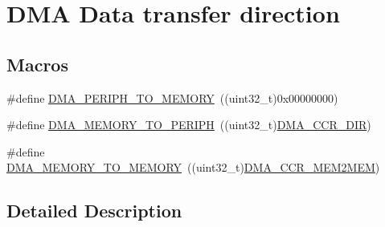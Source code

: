 \hypertarget{group___d_m_a___data__transfer__direction}{\section{D\-M\-A Data transfer direction}
\label{group___d_m_a___data__transfer__direction}
}
\subsection*{Macros}
\begin{DoxyCompactItemize}
\item 
\#define \hyperlink{group___d_m_a___data__transfer__direction_gacb2cbf03ecae6804ae4a6f60a3e37c12}{D\-M\-A\-\_\-\-P\-E\-R\-I\-P\-H\-\_\-\-T\-O\-\_\-\-M\-E\-M\-O\-R\-Y}~((uint32\-\_\-t)0x00000000)
\item 
\#define \hyperlink{group___d_m_a___data__transfer__direction_ga9e76fc559a2d5c766c969e6e921b1ee9}{D\-M\-A\-\_\-\-M\-E\-M\-O\-R\-Y\-\_\-\-T\-O\-\_\-\-P\-E\-R\-I\-P\-H}~((uint32\-\_\-t)\hyperlink{group___peripheral___registers___bits___definition_ga8f1ece172cf3c3e696b86d401d7345a2}{D\-M\-A\-\_\-\-C\-C\-R\-\_\-\-D\-I\-R})
\item 
\#define \hyperlink{group___d_m_a___data__transfer__direction_ga0695035d725855ccf64d2d8452a33810}{D\-M\-A\-\_\-\-M\-E\-M\-O\-R\-Y\-\_\-\-T\-O\-\_\-\-M\-E\-M\-O\-R\-Y}~((uint32\-\_\-t)\hyperlink{group___peripheral___registers___bits___definition_ga5c87a41026384e25fe2312d03af76215}{D\-M\-A\-\_\-\-C\-C\-R\-\_\-\-M\-E\-M2\-M\-E\-M})
\end{DoxyCompactItemize}


\subsection{Detailed Description}


